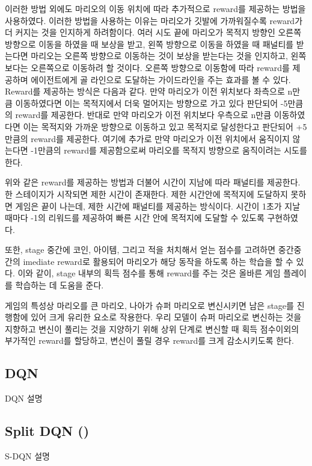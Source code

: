 이러한 방법 외에도 마리오의 이동 위치에 따라 추가적으로 reward를 제공하는 방법을 사용하였다. 
이러한 방법을 사용하는 이유는 마리오가 깃발에 가까워질수록 reward가 더 커지는 것을 인지하게 하려함이다. 
여러 시도 끝에 마리오가 목적지 방향인 오른쪽 방향으로 이동을 하였을 때 보상을 받고, 왼쪽 방향으로 이동을 하였을 때 패널티를 받는다면 마리오는 오른쪽 방향으로 이동하는 것이 보상을 받는다는 것을 인지하고, 왼쪽보다는 오른쪽으로 이동하려 할 것이다.
오른쪽 방향으로 이동함에 따라 reward를 제공하며 에이전트에게 골 라인으로 도달하는 가이드라인을 주는 효과를 볼 수 있다.
Reward를 제공하는 방식은 다음과 같다.
만약 마리오가 이전 위치보다 좌측으로 n만큼 이동하였다면 이는 목적지에서 더욱 멀어지는 방향으로 가고 있다 판단되어 -5만큼의 reward를 제공한다. 
반대로 만약 마리오가 이전 위치보다 우측으로 n만큼 이동하였다면 이는 목적지와 가까운 방향으로 이동하고 있고 목적지로 달성한다고 판단되어 +5만큼의 reward를 제공한다.
여기에 추가로 만약 마리오가 이전 위치에서 움직이지 않는다면 -1만큼의 reward를 제공함으로써 마리오를 목적지 방향으로 움직이려는 시도를 한다. 

위와 같은 reward를 제공하는 방법과 더불어 시간이 지남에 따라 패널티를 제공한다. 
한 스테이지가 시작되면 제한 시간이 존재한다. 
제한 시간안에 목적지에 도달하지 못하면 게임은 끝이 나는데, 제한 시간에 패널티를 제공하는 방식이다. 
시간이 1초가 지날 때마다 -1의 리워드를 제공하여 빠른 시간 안에 목적지에 도달할 수 있도록 구현하였다. 

또한, stage 중간에 코인, 아이템, 그리고 적을 처치해서 얻는 점수를 고려하면 중간중간의 imediate reward로 활용되어 마리오가 해당 동작을 하도록 하는 학습을 할 수 있다.
이와 같이, stage 내부의 획득 점수를 통해 reward를 주는 것은 올바른 게임 플레이를 학습하는 데 도움을 준다.

게임의 특성상 마리오를 큰 마리오, 나아가 슈퍼 마리오로 변신시키면 남은 stage를 진행함에 있어 크게 유리한 요소로 작용한다.
우리 모델이 슈퍼 마리오로 변신하는 것을 지향하고 변신이 풀리는 것을 지양하기 위해 상위 단계로 변신할 때 획득 점수이외의 부가적인 reward를 할당하고, 변신이 풀릴 경우 reward를 크게 감소시키도록 한다.

\subsection{DQN}
\label{sec:method:dqn}
DQN 설명

\subsection{Split DQN (\sdqnname)}
\label{sec:method:sdqn}
S-DQN 설명

